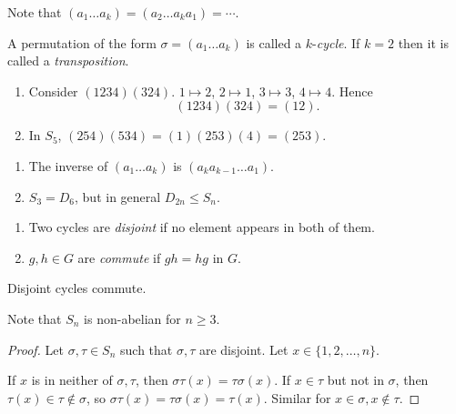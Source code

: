 \documentclass[10pt]{article}
\def\le{\leqslant}
\def\ge{\geqslant}
\newcommand{\bluecomment}[1]{{\color{blue}#1}}
\begin{document}
    Note that $ (a_1 \dots a_k)=(a_2\dots a_{k} a_1)=\cdots $.
    \begin{definition}
        A permutation of the form $ \sigma = (a_1 \dots a_k) $ is called a $k$-\textit{cycle}. If $k=2$ then it is called a \textit{transposition}.
    \end{definition}
    \begin{example}
        \begin{enumerate}[(1).]
            \item Consider $ (1234)(324) $. $ 1 \mapsto 2 $, $ 2 \mapsto 1 $, $ 3 \mapsto 3 $, $4 \mapsto 4 $. Hence
            \[
                (1234)(324)=(12)
            .\]
            \item In $S_5$, $ (254)(534)=(1)(253)(4) = (253) $.
        \end{enumerate}
    \end{example}
    \begin{remark}
        \begin{enumerate}[(1).]
            \item The inverse of $ (a_1 \dots a_k) $ is $ (a_k a_{k-1}\dots a_1) $.
            \item $ S_3=D_6 $, but in general $ D_{2n}\le S_n $.
        \end{enumerate}
    \end{remark}
    \begin{definition}
        \begin{enumerate}[(1).]
            \item Two cycles are \textit{disjoint} if no element appears in both of them.
            \item $ g,h\in G $ are \textit{commute} if $gh=hg$ in $G$.
        \end{enumerate}
    \end{definition}
    \begin{lemma}\label{lma:disjoint_cyc_commute}
        Disjoint cycles commute.

        \bluecomment{Note that $S_n$ is non-abelian for $n\ge 3$.}
    \end{lemma}
    \begin{proof}
        Let $ \sigma, \tau\in S_n $ such that $ \sigma, \tau $ are disjoint. Let $ x\in \{1,2,\dots,n\} $.

        If $x$ is in neither of $\sigma, \tau$, then $ \sigma \tau(x)=\tau \sigma(x) $. If $ x\in \tau $ but not in $ \sigma $, then $ \tau(x)\in \tau\notin \sigma $, so $ \sigma \tau(x)=\tau \sigma(x)=\tau(x) $. Similar for $ x\in \sigma, x\notin \tau $.
    \end{proof}
\end{document}
